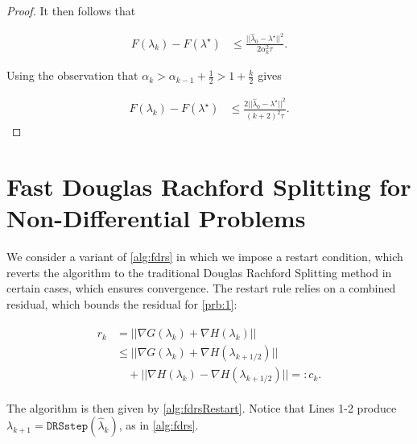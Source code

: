 \documentclass[11pt]{article}
\def\grad {{\nabla}}
\begin{document}
\begin{proof}
It then follows that

\begin{align*}
F(\lambda_k) - F(\lambda^\star) &\le \frac{||\hat\lambda_0 - \lambda^\star||^2}{2\alpha_k^2\tau}.
\end{align*}

Using the observation that $\alpha_k > \alpha_{k-1} + \frac 12 > 1 + \frac k2$ gives

\begin{align*}
F(\lambda_k) - F(\lambda^\star) &\le \frac{2||\hat\lambda_0 - \lambda^\star||^2}{(k+2)^2\tau}.
\end{align*}

\end{proof}

\section{Fast Douglas Rachford Splitting for Non-Differential Problems}

We consider a variant of \cref{alg:fdrs} in which we impose a restart
condition, which reverts the algorithm to the traditional Douglas
Rachford Splitting method in certain cases, which ensures convergence.
The restart rule relies on a combined residual, which bounds the
residual for \cref{prb:1}:

\begin{align}
\begin{split}
r_k &= ||\grad G(\lambda_k) + \grad H(\lambda_k)|| \\
&\le || \grad G(\lambda_k) + \grad H(\lambda_{k+1/2}) || \\
&\quad + || \grad H(\lambda_k) - \grad H(\lambda_{k+1/2}) || =: c_k.
\end{split}
\end{align}

\noindent The algorithm is then given by \cref{alg:fdrsRestart}.
Notice that Lines 1-2 produce $\lambda_{k+1} =
\texttt{DRSstep}(\hat\lambda_k)$, as in \cref{alg:fdrs}.
\end{document}
